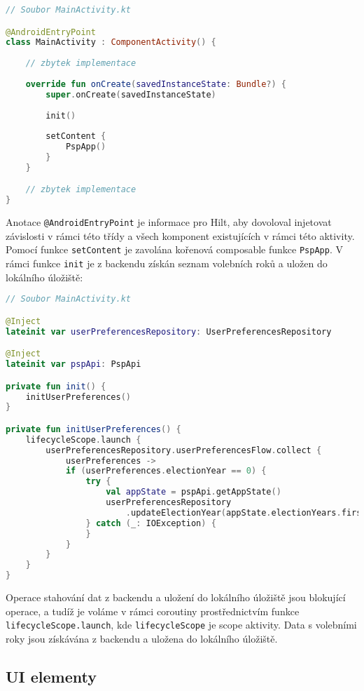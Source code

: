 \begin{lstlisting}[caption={Třída activity}, tabsize=2, language=Kotlin]
// Soubor MainActivity.kt

@AndroidEntryPoint
class MainActivity : ComponentActivity() {
	
	// zbytek implementace
	
	override fun onCreate(savedInstanceState: Bundle?) {
		super.onCreate(savedInstanceState)
		
		init()
		
		setContent {
			PspApp()
		}
	}

	// zbytek implementace
}
\end{lstlisting}

\noindent Anotace \lstinline|@AndroidEntryPoint| je informace pro Hilt, aby dovoloval injetovat závislosti v rámci této třídy a všech komponent existujících v rámci této aktivity. Pomocí funkce \lstinline|setContent| je zavolána kořenová composable funkce \lstinline|PspApp|. V rámci funkce \lstinline|init| je z backendu získán seznam volebních roků a uložen do lokálního úložiště:

\newpage

\begin{lstlisting}[caption={Třída activity}, tabsize=2, language=Kotlin]
// Soubor MainActivity.kt

@Inject
lateinit var userPreferencesRepository: UserPreferencesRepository

@Inject
lateinit var pspApi: PspApi

private fun init() {
	initUserPreferences()
}

private fun initUserPreferences() {
	lifecycleScope.launch {
		userPreferencesRepository.userPreferencesFlow.collect { 
			userPreferences ->
			if (userPreferences.electionYear == 0) {
				try {
					val appState = pspApi.getAppState()
					userPreferencesRepository
						.updateElectionYear(appState.electionYears.first())
				} catch (_: IOException) {
				}
			}
		}
	}
}
\end{lstlisting}

\noindent Operace stahování dat z backendu a uložení do lokálního úložiště jsou blokující operace, a tudíž je voláme v rámci coroutiny prostřednictvím funkce \lstinline|lifecycleScope.launch|, kde \lstinline|lifecycleScope| je scope aktivity. Data s volebními roky jsou získávána z backendu a uložena do lokálního úložiště.

\subsection*{UI elementy}

